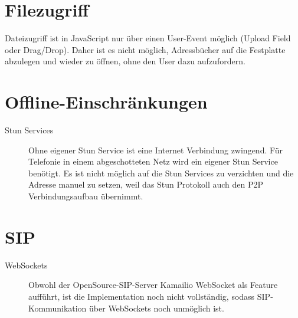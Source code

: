 	 \section{Filezugriff}
	 	Dateizugriff ist in JavaScript nur über einen User-Event möglich (Upload
	 	Field oder Drag/Drop). Daher ist es nicht möglich, Adressbücher auf die
	 	Festplatte abzulegen und wieder zu öffnen, ohne den User dazu aufzufordern.
	 	
	 
	 \section{Offline-Einschränkungen}
	 	\begin{description}
			\item[Stun Services] Ohne eigener Stun Service ist eine Internet Verbindung zwingend. Für Telefonie in einem abgeschotteten Netz wird ein eigener Stun Service benötigt. Es ist nicht möglich auf die Stun Services zu verzichten und die Adresse manuel zu setzen, weil das Stun Protokoll auch den P2P Verbindungsaufbau übernimmt.
	 	\end{description}
	 		
	 \section{SIP}
	 	\begin{description}
			\item[WebSockets] Obwohl der OpenSource-SIP-Server Kamailio WebSocket als Feature aufführt,
	 		ist die Implementation noch nicht vollständig, sodass SIP-Kommunikation über
	 		WebSockets noch unmöglich ist.
	 	\end{description}
	 		
